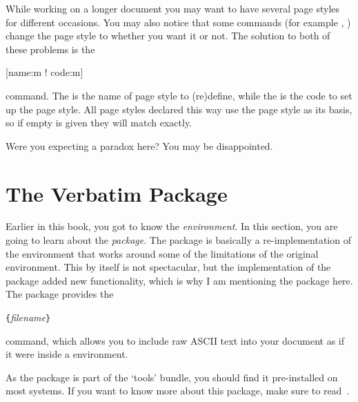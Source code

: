 While working on a longer document you may want to have several page styles for
different occasions. You may also notice that some commands (for example
, ) change the page style to  whether
you want it or not. The solution to both of these problems is the
\begin{lscommand}
  [name:m ! code:m]
\end{lscommand}
command. The  is the name of page style to (re)define, while the %
 is the code to set up the page style. All page styles declared this
way use the  page style as its basis, so if empty  is
given they will match  exactly.
\begin{example}[standalone, paperheight=3cm]
\geometry{includehead, includefoot, headsep=.5em, footskip=1em} %
\sloppy %
\usepackage{fancyhdr}%
\usepackage{extramarks}%
\pagestyle{mine}

Were you expecting a paradox here?
\noindent
You may be disappointed.

\end{example}

\section{The Verbatim Package}

Earlier in this book, you got to know the 
\emph{environment}.  In this section, you are going to learn about the
 \emph{package}. The  package is basically
a re-implementation of the  environment that works around
some of the limitations of the original  environment.
This by itself is not spectacular, but the implementation of the
 package added new functionality, which is
why I am mentioning the package here. The 
package provides the

\begin{lscommand}
  \verb|{|\emph{filename}\verb|}|
\end{lscommand}

\noindent command, which allows you to include raw ASCII text into your
document as if it were inside a  environment.

As the  package is part of the `tools' bundle, you
should find it pre-installed on most systems. If you want to know more
about this package, make sure to read~\cite{pack:verbatim}.

